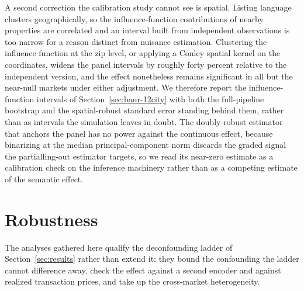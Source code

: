 \documentclass{article}
\begin{document}
A second correction the calibration study cannot see is spatial. Listing language clusters geographically, so the influence-function contributions of nearby properties are correlated and an interval built from independent observations is too narrow for a reason distinct from nuisance estimation. Clustering the influence function at the zip level, or applying a Conley spatial kernel on the coordinates, widens the panel intervals by roughly forty percent relative to the independent version, and the effect nonetheless remains significant in all but the near-null markets under either adjustment. We therefore report the influence-function intervals of Section~\ref{sec:baur-12city} with both the full-pipeline bootstrap and the spatial-robust standard error standing behind them, rather than as intervals the simulation leaves in doubt. The doubly-robust estimator that anchors the panel has no power against the continuous effect, because binarizing at the median principal-component norm discards the graded signal the partialling-out estimator targets, so we read its near-zero estimate as a calibration check on the inference machinery rather than as a competing estimate of the semantic effect.



\section{Robustness}
\label{app:robustness}

The analyses gathered here qualify the deconfounding ladder of
Section~\ref{sec:results} rather than extend it: they bound the confounding the
ladder cannot difference away, check the effect against a second encoder and against
realized transaction prices, and take up the cross-market heterogeneity.














\end{document}

